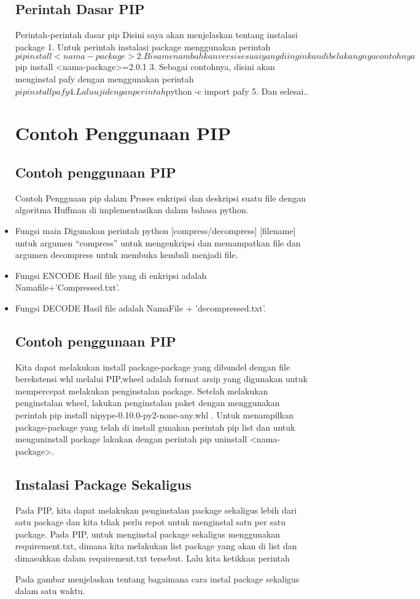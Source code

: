 \begin{itemize}
\subsection{Perintah Dasar PIP}
Perintah-perintah dasar pip
Disini saya akan menjelaskan tentang instalasi package
1.	Untuk perintah instalasi package menggunakan perintah $pip install <nama-package>
2.	Bisa menambahkan versi sesuai yang diinginkan dibelakangnya contohnya $pip install <nama-package>=2.0.1
3.	Sebagai contohnya, disini akan menginstal pafy dengan menggunakan perintah $ pip install pafy
4.	Lalu uji dengan perintah $python -c import pafy
5.	Dan selesai..

\section{Contoh Penggunaan PIP}
\subsection{Contoh penggunaan PIP} 
Contoh Pengguaan pip dalam Proses enkripsi dan deskripsi suatu file dengan algoritma Huffman di implementasikan dalam bahasa python.
\item	Fungsi main
Digunakan perintah python [compress/decompress] [filename] untuk argumen “compress” untuk mengenkripsi dan memampatkan file dan argumen decompress untuk membuka kembali menjadi file.
\item	Fungsi ENCODE
Hasil file yang di enkripsi adalah Namafile+’Compressed.txt’.
\item	Fungsi DECODE
Hasil file adalah NamaFile + ’decompressed.txt’.
\subsection{Contoh penggunaan PIP}
Kita dapat melakukan install package-package yang dibundel dengan file berekstensi whl melalui PIP,wheel adalah format arsip yang digunakan untuk mempercepat melakukan penginstalan package. Setelah melakukan penginstalan wheel, lakukan penginstalan paket dengan menggunakan perintah pip install nipype-0.10.0-py2-none-any.whl . Untuk menampilkan package-package yang telah di install gunakan perintah pip list dan untuk menguninstall package lakukan dengan perintah pip uninstall <nama-package>.
\subsection{Instalasi Package Sekaligus}
Pada PIP, kita dapat melakukan penginstalan package sekaligus lebih dari satu package dan  kita tdiak perlu repot untuk menginstal satu per satu package. Pada PIP, untuk menginstal package sekaligus menggunakan requirement.txt, dimana kita melakukan list package yang akan di list dan dimasukkan dalam requirement.txt tersebut. Lalu kita ketikkan perintah

Pada gambar menjelaskan tentang bagaimana cara instal package sekaligus dalam satu waktu.
\end{itemize}
